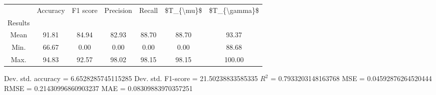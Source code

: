 \begin{tabular}{|c|c|c|c|c|c|c|}
\toprule
{} &  Accuracy &  F1 score &  Precision &  Recall &  \$T\_\{\textbackslash mu\}\$ &  \$T\_\{\textbackslash gamma\}\$ \\
Results &           &           &            &         &            &               \\
\hline
Mean    &     91.81 &     84.94 &      82.93 &   88.70 &      88.70 &         93.37 \\
Min.    &     66.67 &      0.00 &       0.00 &    0.00 &       0.00 &         88.68 \\
Max.    &     94.83 &     92.57 &      98.02 &   98.15 &      98.15 &        100.00 \\
\bottomrule
\end{tabular}

 Dev. std. accuracy = 6.6528285745115285
 Dev. std. F1-score = 21.50238833585335
 $R^2$ = 0.7933203148163768
 MSE = 0.04592876264520444
 RMSE = 0.21430996860903237
 MAE = 0.08309883970357251